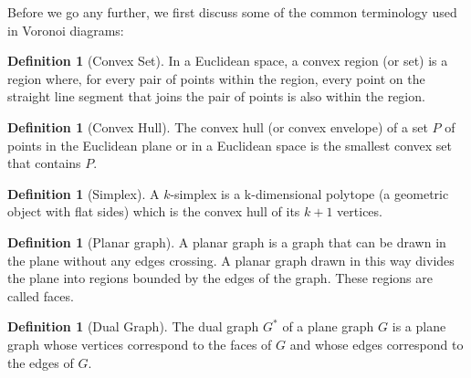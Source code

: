 \documentclass[10pt,a4paper]{article}
\theoremstyle{plain}
\theoremstyle{definition}
\newtheorem{defn}[subsection]{Definition}
\begin{document}
      Before we go any further, we first discuss some of the common terminology used in Voronoi diagrams:
      \\
      \begin{defn}[Convex Set]
      	In a Euclidean space, a convex region (or set) is a region where, for every pair of points within the region, every point on the straight line segment that joins the pair of points is also within the region.
      \end{defn}
 
      \begin{defn}[Convex Hull]
      	The convex hull (or convex envelope) of a set $P$ of points in the Euclidean plane or in a Euclidean space is the smallest convex set that contains $P$.
      \end{defn}
       \begin{defn}[Simplex]
       	A $k$-simplex is a k-dimensional polytope (a geometric object with flat sides) which is the convex hull of its $k+1$ vertices.
       \end{defn}
       \begin{defn}[Planar graph]
       	A planar graph is a graph that can be drawn in the plane without any edges crossing. A planar graph drawn in this way divides the plane into regions bounded by the edges of the graph. These regions are called faces. 
       \end{defn} 
       \begin{defn}[Dual Graph]
       	The dual graph $G^*$ of a plane graph $G$ is a plane graph whose vertices correspond to the faces of $G$ and whose edges correspond to the edges of $G$.
       \end{defn}
      
\end{document}
